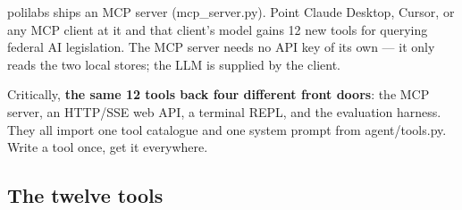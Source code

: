 \documentclass[11pt]{article}
\newcommand{\code}[1]{{\ttfamily\small #1}}
\begin{document}
polilabs ships an MCP server (\code{mcp\_server.py}). Point Claude Desktop,
Cursor, or any MCP client at it and that client's model gains 12 new tools for
querying federal AI legislation. The MCP server needs no API key of its own ---
it only reads the two local stores; the LLM is supplied by the client.

Critically, \textbf{the same 12 tools back four different front doors}: the MCP
server, an HTTP/SSE web API, a terminal REPL, and the evaluation harness. They
all import one tool catalogue and one system prompt from \code{agent/tools.py}.
Write a tool once, get it everywhere.

\subsection{The twelve tools}
\end{document}
